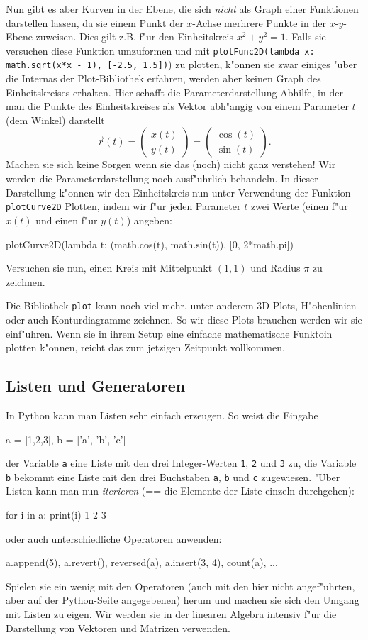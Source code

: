 \documentclass{article}
\begin{document}
Nun gibt es aber Kurven in der Ebene, die sich \textit{nicht} als Graph einer Funktionen darstellen lassen, da sie einem Punkt der $x$-Achse merhrere Punkte in der $x$-$y$-Ebene zuweisen. Dies gilt z.B. f"ur den Einheitskreis $x^2 + y^2 = 1$. Falls sie versuchen diese Funktion umzuformen und mit \verb+plotFunc2D(lambda x: math.sqrt(x*x - 1), [-2.5, 1.5])+) zu plotten, k"onnen sie zwar einiges "uber die Internas der Plot-Bibliothek erfahren, werden aber keinen Graph des Einheitskreises erhalten. Hier schafft die Parameterdarstellung Abhilfe, in der man die Punkte des Einheitskreises als Vektor abh"angig von einem Parameter $t$ (dem Winkel) darstellt
$$
  \vec{r}(t) = \begin{pmatrix} x(t) \\ y(t)\end{pmatrix} = \begin{pmatrix} \cos(t) \\ \sin(t)\end{pmatrix}.
$$
Machen sie sich keine Sorgen wenn sie das (noch) nicht ganz verstehen! Wir werden die Parameterdarstellung noch ausf"uhrlich behandeln. In dieser Darstellung k"onnen wir den Einheitskreis nun unter Verwendung der Funktion \verb+plotCurve2D+ Plotten, indem wir f"ur jeden Parameter $t$ zwei Werte (einen f"ur $x(t)$ und einen f"ur $y(t)$) angeben:
\begin{python}
plotCurve2D(lambda t: (math.cos(t), math.sin(t)), [0, 2*math.pi])
\end{python}
Versuchen sie nun, einen Kreis mit Mittelpunkt $(1,1)$ und Radius $\pi$ zu zeichnen.

Die Bibliothek \verb+plot+ kann noch viel mehr, unter anderem 3D-Plots, H"ohenlinien oder auch Konturdiagramme zeichnen. So wir diese Plots brauchen werden wir sie einf"uhren. Wenn sie in ihrem Setup eine einfache mathematische Funktoin plotten k"onnen, reicht das zum jetzigen Zeitpunkt vollkommen.
\subsection*{Listen und Generatoren}
In Python kann man Listen sehr einfach erzeugen. So weist die Eingabe 
\begin{python}
a = [1,2,3], b = ['a', 'b', 'c']
\end{python}
der Variable {\verb+a+} eine Liste mit den drei Integer-Werten \verb+1+, \verb+2+ und \verb+3+ zu, 
die Variable {\verb+b+} bekommt eine Liste mit den drei Buchstaben \verb+a+, \verb+b+ und \verb+c+ zugewiesen.
"Uber Listen kann man nun \textit{iterieren} (== die Elemente der Liste einzeln durchgehen):
\begin{python}
for i in a:
  print(i)
1
2
3
\end{python}
oder auch unterschiedliche Operatoren anwenden:
\begin{python}
a.append(5), a.revert(), reversed(a), a.insert(3, 4), count(a), ... 
\end{python}
Spielen sie ein wenig mit den Operatoren (auch mit den hier nicht angef"uhrten, aber auf der Python-Seite \cite{pythonwebsite} angegebenen) herum und machen sie sich den Umgang mit Listen zu eigen.
Wir werden sie in der linearen Algebra intensiv f"ur die Darstellung von Vektoren und Matrizen
verwenden.
\end{document}
